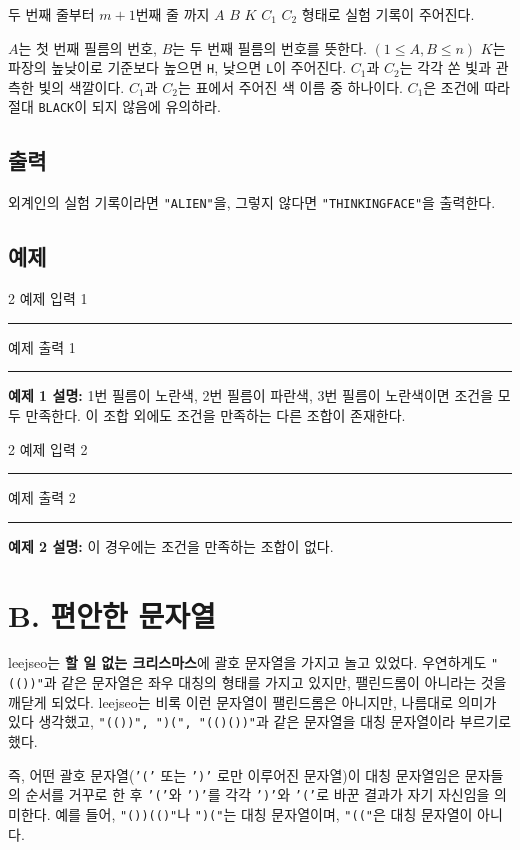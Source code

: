 \documentclass{article}
\def\inputdataname{예제 입력 } %
\def\outputdataname{예제 출력 } %
\newcommand{\iodataNo}[2]{%
	\begin{minipage}{\textwidth}
		\begin{multicols}{2}
			{\inputdataname#2} \\
			\rule{\columnwidth}{1pt}
			
			\columnbreak
			{\outputdataname#2} \\
			\rule{\columnwidth}{1pt}
			
		\end{multicols}
		\vspace{\baselineskip}
	\end{minipage}

}
\begin{document}
두 번째 줄부터 $m+1$번째 줄 까지 $A$ $B$ $K$ $C_1$ $C_2$ 형태로 실험 기록이 주어진다.\newline

$A$는 첫 번째 필름의 번호, $B$는 두 번째 필름의 번호를 뜻한다. $(1\le A,B \le n)$ $K$는 파장의 높낮이로 기준보다 높으면 \texttt{H}, 낮으면 \texttt{L}이 주어진다. $C_1$과 $C_2$는 각각 쏜 빛과 관측한 빛의 색깔이다. $C_1$과 $C_2$는 표에서 주어진 색 이름 중 하나이다. $C_1$은 조건에 따라 절대 \texttt{BLACK}이 되지 않음에 유의하라. 

\subsection{출력}
외계인의 실험 기록이라면 \texttt{"ALIEN"}을, 그렇지 않다면 \texttt{"THINKINGFACE"}을 출력한다.

\subsection{예제}

\iodataNo{film1}{1}

\textbf{예제 1 설명:} 1번 필름이 노란색, 2번 필름이 파란색, 3번 필름이 노란색이면 조건을 모두 만족한다. 이 조합 외에도 조건을 만족하는 다른 조합이 존재한다. \newline

\iodataNo{film2}{2}



\textbf{예제 2 설명:} 이 경우에는 조건을 만족하는 조합이 없다. \newline

\newpage

\section{B. 편안한 문자열}
leejseo는 \textbf{할 일 없는 크리스마스}에 괄호 문자열을 가지고 놀고 있었다. 우연하게도 \texttt{"(())"}과 같은 문자열은 좌우 대칭의 형태를 가지고 있지만, 팰린드롬이 아니라는 것을 깨닫게 되었다. leejseo는 비록 이런 문자열이 팰린드롬은 아니지만, 나름대로 의미가 있다 생각했고, \texttt{"(())", ")(", "(()())"}과 같은 문자열을 대칭 문자열이라 부르기로 했다.\newline

즉, 어떤 괄호 문자열(\texttt{'('} 또는 \texttt{')'} 로만 이루어진 문자열)이 대칭 문자열임은 문자들의 순서를 거꾸로 한 후 \texttt{'('}와 \texttt{')'}를 각각 \texttt{')'}와 \texttt{'('}로 바꾼 결과가 자기 자신임을 의미한다. 예를 들어, \texttt{"())(()"}나 \texttt{")("}는 대칭 문자열이며, \texttt{"(("}은 대칭 문자열이 아니다.\newline
\end{document}
